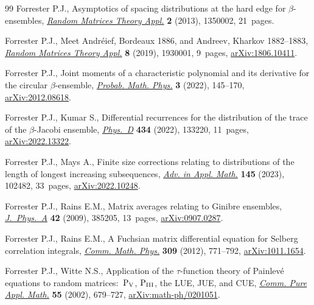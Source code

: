 \documentclass[pdftex]{sigma}
\numberwithin{equation}{section}
\theoremstyle{definition}
\begin{document}
\begin{thebibliography}{99}
Forrester P.J., Asymptotics of spacing distributions at the hard edge for
 {$\beta$}-ensembles,
 \href{https://doi.org/10.1142/S2010326313500020}{\textit{Random Matrices
 Theory Appl.}} \textbf{2} (2013), 1350002, 21~pages.

Forrester P.J., Meet {A}ndr\'eief, {B}ordeaux 1886, and {A}ndreev, Kharkov
 1882--1883, \href{https://doi.org/10.1142/S2010326319300018}{\textit{Random
 Matrices Theory Appl.}} \textbf{8} (2019), 1930001, 9~pages,
 \href{http://arxiv.org/abs/1806.10411}{arXiv:1806.10411}.

Forrester P.J., Joint moments of a characteristic polynomial and its derivative
 for the circular {$\beta$}-ensemble,
 \href{https://doi.org/10.2140/pmp.2022.3.145}{\textit{Probab. Math. Phys.}}
 \textbf{3} (2022), 145--170,
 \href{http://arxiv.org/abs/2012.08618}{arXiv:2012.08618}.

Forrester P.J., Kumar S., Differential recurrences for the distribution of the
 trace of the {$\beta$}-{J}acobi ensemble,
 \href{https://doi.org/10.1016/j.physd.2022.133220}{\textit{Phys.~D}}
 \textbf{434} (2022), 133220, 11~pages,
 \href{http://arxiv.org/abs/2022.13322}{arXiv:2022.13322}.

Forrester P.J., Mays A., Finite size corrections relating to distributions of
 the length of longest increasing subsequences,
 \href{https://doi.org/10.1016/j.aam.2022.102482}{\textit{Adv. in Appl.
 Math.}} \textbf{145} (2023), 102482, 33~pages,
 \href{http://arxiv.org/abs/2022.10248}{arXiv:2022.10248}.

Forrester P.J., Rains E.M., Matrix averages relating to {G}inibre ensembles,
 \href{https://doi.org/10.1088/1751-8113/42/38/385205}{\textit{J.~Phys.~A}}
 \textbf{42} (2009), 385205, 13~pages,
 \href{http://arxiv.org/abs/0907.0287}{arXiv:0907.0287}.

Forrester P.J., Rains E.M., A {F}uchsian matrix differential equation for
 {S}elberg correlation integrals,
 \href{https://doi.org/10.1007/s00220-011-1305-y}{\textit{Comm. Math. Phys.}}
 \textbf{309} (2012), 771--792,
 \href{http://arxiv.org/abs/1011.1654}{arXiv:1011.1654}.

Forrester P.J., Witte N.S., Application of the {$\tau$}-function theory of
 {P}ainlev\'e equations to random matrices:~{$\rm P_V$}, {$\rm P_{III}$}, the
 {LUE}, {JUE}, and {CUE},
 \href{https://doi.org/10.1002/cpa.3021}{\textit{Comm. Pure Appl. Math.}}
 \textbf{55} (2002), 679--727,
 \href{http://arxiv.org/abs/math-ph/0201051}{arXiv:math-ph/0201051}.


\end{thebibliography}
\end{document}
